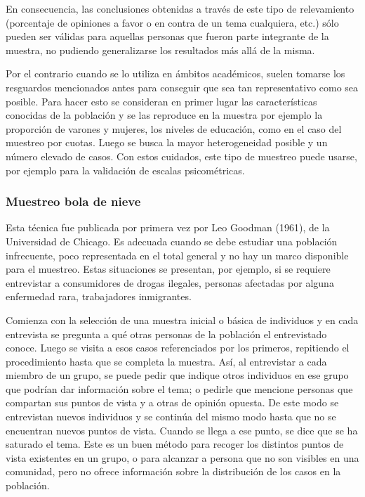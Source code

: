\documentclass[]{article}
\begin{document}
En consecuencia, las conclusiones obtenidas a través de este tipo de
relevamiento (porcentaje de opiniones a favor o en contra de un tema
cualquiera, etc.) sólo pueden ser válidas para aquellas personas que
fueron parte integrante de la muestra, no pudiendo generalizarse los
resultados más allá de la misma.

Por el contrario cuando se lo utiliza en ámbitos académicos, suelen
tomarse los resguardos mencionados antes para conseguir que sea tan
representativo como sea posible. Para hacer esto se consideran en primer
lugar las características conocidas de la población y se las reproduce
en la muestra por ejemplo la proporción de varones y mujeres, los
niveles de educación, como en el caso del muestreo por cuotas. Luego se
busca la mayor heterogeneidad posible y un número elevado de casos. Con
estos cuidados, este tipo de muestreo puede usarse, por ejemplo para la
validación de escalas psicométricas.

\hypertarget{muestreo-bola-de-nieve}{%
\subsubsection{Muestreo bola de nieve}\label{muestreo-bola-de-nieve}}

Esta técnica fue publicada por primera vez por Leo Goodman (1961), de la
Universidad de Chicago. Es adecuada cuando se debe estudiar una
población infrecuente, poco representada en el total general y no hay un
marco disponible para el muestreo. Estas situaciones se presentan, por
ejemplo, si se requiere entrevistar a consumidores de drogas ilegales,
personas afectadas por alguna enfermedad rara, trabajadores inmigrantes.

Comienza con la selección de una muestra inicial o básica de individuos
y en cada entrevista se pregunta a qué otras personas de la población el
entrevistado conoce. Luego se visita a esos casos referenciados por los
primeros, repitiendo el procedimiento hasta que se completa la muestra.
Así, al entrevistar a cada miembro de un grupo, se puede pedir que
indique otros individuos en ese grupo que podrían dar información sobre
el tema; o pedirle que mencione personas que compartan sus puntos de
vista y a otras de opinión opuesta. De este modo se entrevistan nuevos
individuos y se continúa del mismo modo hasta que no se encuentran
nuevos puntos de vista. Cuando se llega a ese punto, se dice que se ha
saturado el tema. Este es un buen método para recoger los distintos
puntos de vista existentes en un grupo, o para alcanzar a persona que no
son visibles en una comunidad, pero no ofrece información sobre la
distribución de los casos en la población.
\end{document}
